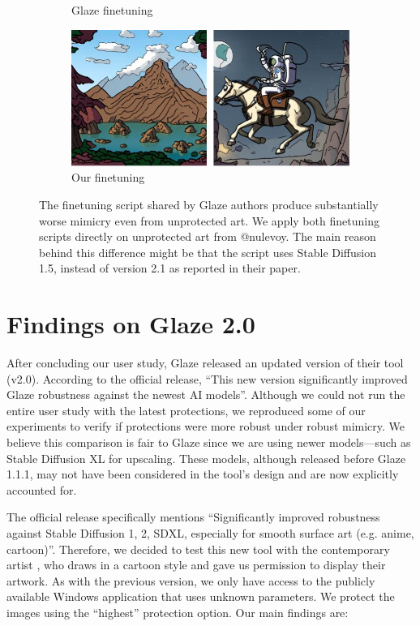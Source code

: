 \documentclass{article}
\begin{document}
\begin{figure}[h]
\begin{subfigure}[b]{0.39\textwidth}
         \caption{Glaze finetuning}
     \end{subfigure}
    \hfill
     \begin{subfigure}[b]{0.39\textwidth}
        \centering
         \includegraphics[width=\textwidth]{plots/ours-unp.jpg}
         \caption{Our finetuning}
     \end{subfigure}

\caption{The finetuning script shared by Glaze authors produce substantially worse mimicry even from unprotected art. We apply both finetuning scripts directly on unprotected art from @nulevoy. The main reason behind this difference might be that the script uses Stable Diffusion 1.5, instead of version 2.1 as reported in their paper.}
    \label{fig:glazebad-unp}
\end{figure}


\clearpage

\section{Findings on Glaze 2.0}
\label{ap:glaze20}

After concluding our user study, Glaze \citep{glaze} released an updated version of their tool (v2.0). According to the official release, ``This new version significantly improved Glaze robustness against the newest AI models''. Although we could not run the entire user study with the latest protections, we reproduced some of our experiments to verify if protections were more robust under robust mimicry. We believe this comparison is fair to Glaze since we are using newer models---such as Stable Diffusion XL for upscaling. These models, although released before Glaze 1.1.1, may not have been considered in the tool’s design and are now explicitly accounted for.


The official release specifically mentions ``Significantly improved robustness against Stable Diffusion 1, 2, SDXL, especially for smooth surface art (e.g. anime, cartoon)''. Therefore, we decided to test this new tool with the contemporary artist \emph{\@nulevoy}, who draws in a cartoon style and gave us permission to display their artwork. As with the previous version, we only have access to the publicly available Windows application that uses unknown parameters. We protect the images using the ``highest'' protection option. Our main findings are:
\end{document}
